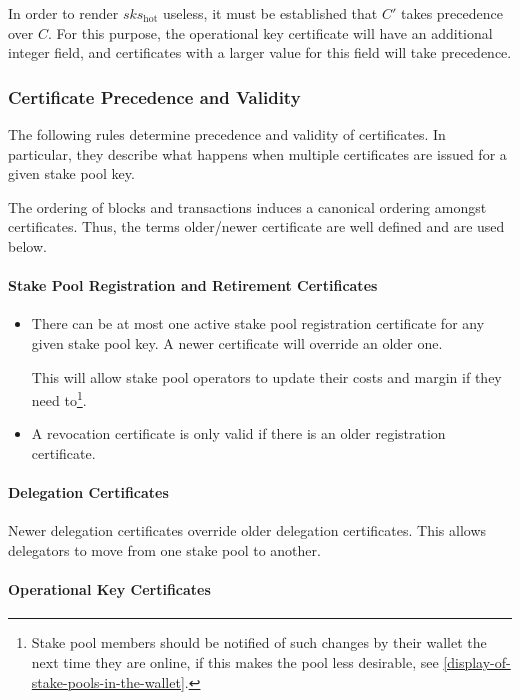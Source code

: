 \documentclass[11pt,a4paper]{article}
\begin{document}
In order to render \(sks_\text{hot}\) useless, it must be established
that \(C'\) takes precedence over \(C\). For this purpose, the
operational key certificate will have an additional integer
field, and certificates with a larger value for this field will take
precedence.

\subsubsection{Certificate Precedence and Validity}
\label{certificate-precedence-and-validity}

The following rules determine precedence and validity of certificates.
In particular, they describe what happens when multiple certificates are
issued for a given stake pool key.

The ordering of blocks and transactions induces a canonical ordering
amongst certificates. Thus, the terms older/newer certificate are well
defined and are used below.

\paragraph{Stake Pool Registration and Retirement Certificates}
\label{stake-pool-registration-and-retirement-certificates}

\begin{itemize}
\item
  There can be at most one active stake pool registration certificate
  for any given stake pool key. A newer certificate will override an older
  one.

  This will allow stake pool operators to update their costs and margin
  if they need to\footnote{Stake pool members should be notified of such changes
  by their wallet the next time they are online, if this makes the pool less
  desirable, see \cref{display-of-stake-pools-in-the-wallet}.}.
\item
  A revocation certificate is only valid if there is an older
  registration certificate.
\end{itemize}

\paragraph{Delegation Certificates}

Newer delegation certificates override older delegation certificates. This
allows delegators to move from one stake pool to another.

\paragraph{Operational Key Certificates}
\label{operational-key-certificates-1}
\end{document}
